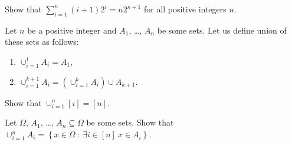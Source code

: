\documentclass[addpoints]{exam}
\begin{document}
  \pagestyle{headandfoot}
  \runningheadrule

  \firstpagefooter{}{}{}
  \runningfooter{}{}{}
  \begin{flushright}

    \vspace{0.2in}
  \end{flushright}

  \begin{questions}
    \question
      Show that $\sum_{i = 1}^n (i + 1) 2^i = n 2^{n + 1}$ for all positive integers
			$n$.

      \begin{solution}[\stretch{1}]
      \end{solution}
      \newpage
    \question
      Let $n$ be a positive integer and $A_1$, \dots, $A_n$ be some sets.
			Let us define union of these sets as follows:
			\begin{enumerate}
			    \item $\cup_{i = 1}^1 A_i = A_1$,
			    \item $\cup_{i = 1}^{k + 1} A_i =
			        (\cup_{i = 1}^{k} A_i) \cup A_{k + 1}$.
			\end{enumerate}
			
			Show that $\cup_{i = 1}^n [i] = [n]$.

      \begin{solution}[\stretch{1}]
      \end{solution}
      \newpage
    \question
      Let $\Omega$, $A_1$, \dots, $A_n \subseteq \Omega$ be some sets.
			Show that
			$\cup_{i = 1}^n A_i =
			    \left\{x \in \Omega ~:~ \exists i \in [n] \  x \in A_i \right\}$.

      \begin{solution}[\stretch{1}]
      \end{solution}
      \newpage
  \end{questions}
\end{document}
